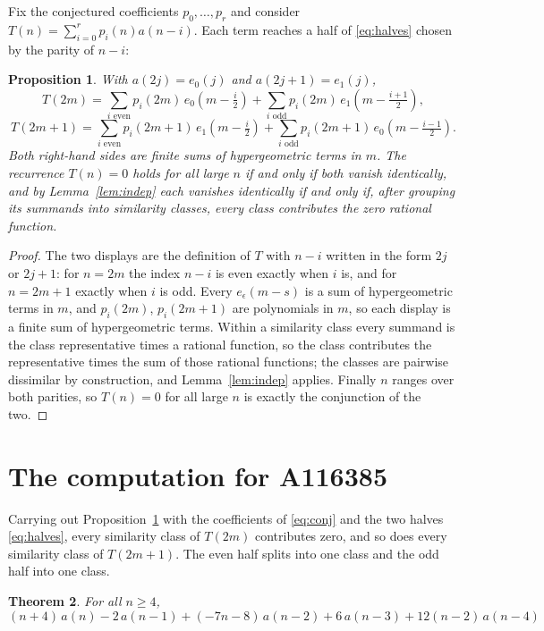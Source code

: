 \documentclass[11pt,a4paper]{article}
\theoremstyle{plain}
\newtheorem{theorem}{Theorem}
\newtheorem{proposition}[theorem]{Proposition}
\theoremstyle{definition}
\begin{document}
Fix the conjectured coefficients $p_{0},\dots,p_{r}$ and consider
$T(n)=\sum_{i=0}^{r}p_{i}(n)a(n-i)$. Each term reaches a half of \eqref{eq:halves} chosen
by the parity of $n-i$:

\begin{proposition}\label{prop:split}
With $a(2j)=e_{0}(j)$ and $a(2j+1)=e_{1}(j)$,
\[
T(2m)=\sum_{i \text{ even}}p_{i}(2m)\,e_{0}\!\left(m-\tfrac{i}{2}\right)
      +\sum_{i \text{ odd}}p_{i}(2m)\,e_{1}\!\left(m-\tfrac{i+1}{2}\right),
\]
\[
T(2m+1)=\sum_{i \text{ even}}p_{i}(2m+1)\,e_{1}\!\left(m-\tfrac{i}{2}\right)
      +\sum_{i \text{ odd}}p_{i}(2m+1)\,e_{0}\!\left(m-\tfrac{i-1}{2}\right).
\]
Both right-hand sides are finite sums of hypergeometric terms in $m$. The recurrence
$T(n)=0$ holds for all large $n$ if and only if both vanish identically, and by
Lemma~\ref{lem:indep} each vanishes identically if and only if, after grouping its
summands into similarity classes, every class contributes the zero rational function.
\end{proposition}

\begin{proof}
The two displays are the definition of $T$ with $n-i$ written in the form $2j$ or $2j+1$:
for $n=2m$ the index $n-i$ is even exactly when $i$ is, and for $n=2m+1$ exactly when $i$
is odd. Every $e_{\epsilon}(m-s)$ is a sum of hypergeometric terms in $m$, and
$p_{i}(2m)$, $p_{i}(2m+1)$ are polynomials in $m$, so each display is a finite sum of
hypergeometric terms. Within a similarity class every summand is the class representative
times a rational function, so the class contributes the representative times the sum of
those rational functions; the classes are pairwise dissimilar by construction, and
Lemma~\ref{lem:indep} applies. Finally $n$ ranges over both parities, so $T(n)=0$ for all
large $n$ is exactly the conjunction of the two.
\end{proof}

\section{The computation for A116385}

Carrying out Proposition~\ref{prop:split} with the coefficients of \eqref{eq:conj} and the
two halves \eqref{eq:halves}, every similarity class of $T(2m)$ contributes zero, and so
does every similarity class of $T(2m+1)$. The even half splits into one class
and the odd half into one class.

\begin{theorem}
For all $n\ge 4$,
\[
(n + 4)\,a(n) - 2\,a(n-1) + (- 7 n - 8)\,a(n-2) + 6\,a(n-3) + 12 \left(n - 2\right)\,a(n-4)
\]
\end{theorem}
\end{document}
